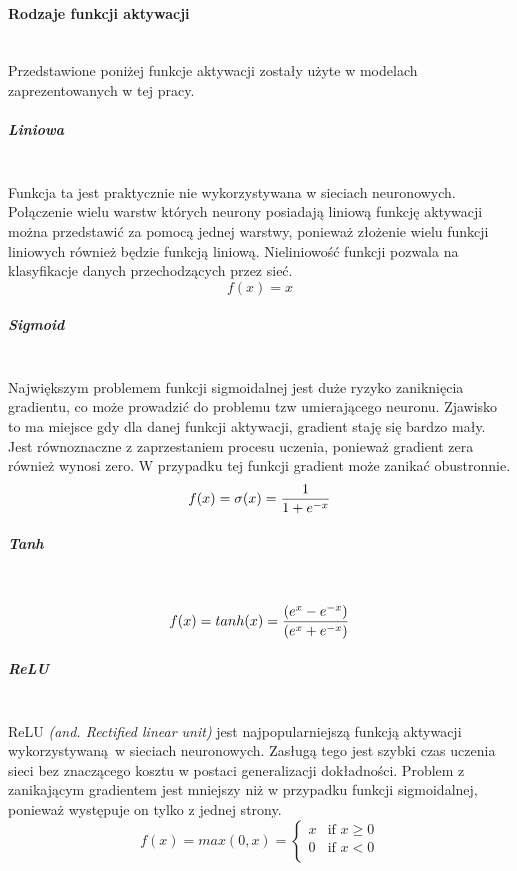 \paragraph{Rodzaje funkcji aktywacji} \mbox{}\\
Przedstawione poniżej funkcje aktywacji zostały użyte w modelach zaprezentowanych
w tej pracy.

\subparagraph{Liniowa} \mbox{}\\
Funkcja ta jest praktycznie nie wykorzystywana w sieciach neuronowych. Połączenie
wielu warstw których neurony posiadają liniową funkcję aktywacji można przedstawić
za pomocą jednej warstwy,  ponieważ złożenie wielu funkcji liniowych również będzie
funkcją liniową. Nieliniowość funkcji pozwala na klasyfikacje danych przechodzących
przez sieć.
\begin{equation}
f(x) = x
\end{equation}


\subparagraph{Sigmoid} \mbox{}\\
Największym problemem funkcji sigmoidalnej jest duże ryzyko zaniknięcia gradientu,
co może prowadzić do problemu tzw umierającego neuronu. Zjawisko to ma miejsce
gdy dla danej funkcji aktywacji, gradient staję się bardzo mały. Jest równoznaczne
z zaprzestaniem procesu uczenia, ponieważ gradient zera również wynosi zero.
W przypadku tej funkcji gradient może zanikać obustronnie.
\begin{equation}
f(x) = \sigma(x) = \frac{1}{1 + e^{-x}} \\
\end{equation}

\subparagraph{Tanh} \mbox{}\\
\begin{equation}
f(x) = tanh(x) = \frac{(e^x - e^{-x})}{(e^x + e^{-x})} \\
\end{equation}

\subparagraph{ReLU} \mbox{}\\
ReLU \textit{(and. Rectified linear unit)} jest najpopularniejszą funkcją aktywacji
wykorzystywaną w sieciach neuronowych. Zasługą tego jest szybki czas uczenia sieci
bez znaczącego kosztu w postaci generalizacji dokładności. Problem z zanikającym
gradientem jest mniejszy niż w przypadku funkcji sigmoidalnej, ponieważ występuje
on tylko z jednej strony.
\begin{equation}
f(x) = max(0, x) =
\begin{cases}
 x & \text{if } x \geqslant 0 \\
 0 & \text{if } x < 0 \\
\end{cases}
\end{equation}

